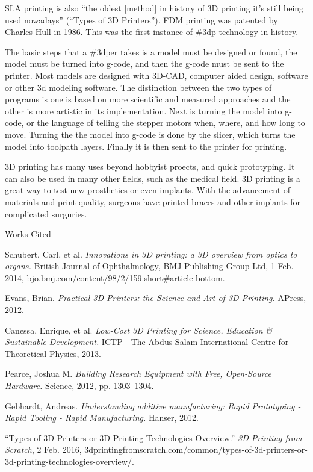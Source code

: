 \documentclass[12pt]{article}
\newcommand{\bibent}{\noindent \hangindent 40pt}
\newenvironment{workscited}{\newpage \begin{center} Works Cited \end{center}}{\newpage }
\begin{document}
\begin{flushleft}
SLA printing is also ``the oldest [method] in history of 3D printing it’s still being used nowadays'' (``Types of 3D Printers''). FDM printing was patented by Charles Hull in 1986. This was the first instance of \#3dp technology in history.

The basic steps that a \#3dper takes is a model must be designed or found, the model must be turned into g-code, and then the g-code must be sent to the printer. Most models are designed with 3D-CAD, computer aided design, software or other 3d modeling software. The distinction between the two types of programs is one is based on more scientific and measured approaches and the other is more artistic in its implementation. Next is turning the model into g-code, or the language of telling the stepper motors when, where, and how long to move. Turning the the model into g-code is done by the slicer, which turns the model into toolpath layers. Finally it is then sent to the printer for printing.

3D printing has many uses beyond hobbyist proects, and quick prototyping. It can also be used in many other fields, such as the medical field. 3D printing is a great way to test new prosthetics or even implants. With the advancement of materials and print quality, surgeons have printed braces and other implants for complicated surguries. 

\begin{workscited}

\bibent
Schubert, Carl, et al. \textit{Innovations in 3D printing: a 3D overview from optics to organs.} British Journal of Ophthalmology, BMJ Publishing Group Ltd, 1 Feb. 2014, bjo.bmj.com/content/98/2/159.short\#article-bottom.

\bibent
Evans, Brian. \textit{Practical 3D Printers: the Science and Art of 3D Printing.} APress, 2012.

\bibent
Canessa, Enrique, et al. \textit{Low-Cost 3D Printing for Science, Education \& Sustainable Development.} ICTP—The Abdus Salam International Centre for Theoretical Physics, 2013.

\bibent
Pearce, Joshua M. \textit{Building Research Equipment with Free, Open-Source Hardware.} Science, 2012, pp. 1303–1304.

\bibent
Gebhardt, Andreas. \textit{Understanding additive manufacturing: Rapid Prototyping - Rapid Tooling - Rapid Manufacturing.} Hanser, 2012.

\bibent
``Types of 3D Printers or 3D Printing Technologies Overview.'' \textit{3D Printing from Scratch}, 2 Feb. 2016, 3dprintingfromscratch.com/common/types-of-3d-printers-or-3d-printing-technologies-overview/.

\end{workscited}

\end{flushleft}
\end{document}
